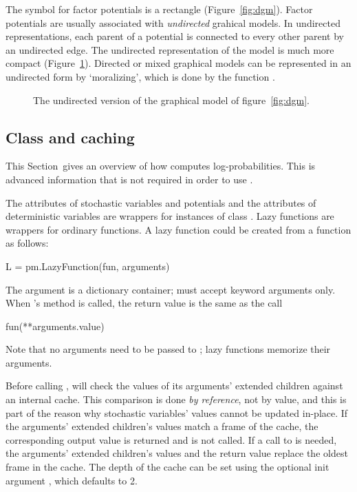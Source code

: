 \documentclass[]{jss}
\begin{document}
The symbol for factor potentials is a rectangle (Figure~\ref{fig:dgm}). Factor potentials are usually associated with \emph{undirected} grahical models. In undirected representations, each parent of a potential is connected to every other parent by an undirected edge. The undirected representation of the model is much more compact (Figure~\ref{fig:dgm-collapsed}). Directed or mixed graphical models can be represented in an undirected form by `moralizing', which is done by the function .

\begin{figure}[h!]
\begin{center}
    \caption{The undirected version of the graphical model of figure~\ref{fig:dgm}.}
	\label{fig:dgm-collapsed}
\end{center}
\end{figure}


\subsection[Class LazyFunction and caching]{Class 
and caching}
\label{sec:caching}
This Section~gives an overview of how  computes log-probabilities. This is advanced information that is not required in order to use .

The  attributes of stochastic variables and potentials and the  attributes of deterministic variables are wrappers for instances of class . Lazy functions are wrappers for ordinary  functions. A lazy function  could be created from a function  as follows:
\begin{CodeInput}
L = pm.LazyFunction(fun, arguments)
\end{CodeInput}
The argument  is a dictionary container;  must accept keyword arguments only. When 's  method is called, the return value is the same as the call
\begin{CodeInput}
fun(**arguments.value)
\end{CodeInput}
Note that no arguments need to be passed to ; lazy functions memorize their arguments.

Before calling ,  will check the values of its arguments' extended children against an internal cache. This comparison is done \emph{by reference}, not by value, and this is part of the reason why stochastic variables' values cannot be updated in-place. If the arguments' extended children's values match a frame of the cache, the corresponding output value is returned and  is not called. If a call to  is needed, the arguments' extended children's values and the return value replace the oldest frame in the cache. The depth of the cache can be set using the optional init argument , which defaults to 2.
\end{document}
